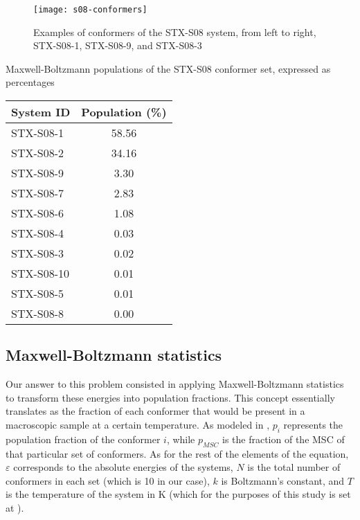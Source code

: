 \begin{figure}
    \texttt{[image: s08-conformers]}
    \caption[Conformers of STX-S08]{Examples of conformers of the STX-S08 system, from left to right, STX-S08-1, STX-S08-9, and STX-S08-3}
\end{figure}

\begin{margintable}
    \centering
    \caption[Maxwell-Boltzmann populations of STX-S08]{Maxwell-Boltzmann populations of the STX-S08 conformer set, expressed as percentages}
    \begin{tabular}{@{}l
                       S[table-format=2.2]@{}}
        \toprule
        System ID & {Population (\si{\percent})} \\
        \midrule
        STX-S08-1 & 58.56 \\
        STX-S08-2 & 34.16 \\
        STX-S08-9 & 3.30 \\
        STX-S08-7 & 2.83 \\
        STX-S08-6 & 1.08 \\
        STX-S08-4 & 0.03 \\
        STX-S08-3 & 0.02 \\
        STX-S08-10 & 0.01 \\
        STX-S08-5 & 0.01 \\
        STX-S08-8 & 0.00 \\
    \end{tabular}
\end{margintable}

\subsection{Maxwell-Boltzmann statistics}
Our answer to this problem consisted in applying Maxwell-Boltzmann statistics to transform these energies into population fractions.
This concept essentially translates as the fraction of each conformer that would be present in a macroscopic sample at a certain temperature.
As modeled in , $p_i$ represents the population fraction of the conformer $i$, while $p_\textit{MSC}$ is the fraction of the MSC of that particular set of conformers.
As for the rest of the elements of the equation, $\varepsilon$ corresponds to the absolute energies of the systems, $N$ is the total number of conformers in each set (which is 10 in our case), $k$ is Boltzmann's constant, and $T$ is the temperature of the system in \si{\kelvin} (which for the purposes of this study is set at ).

